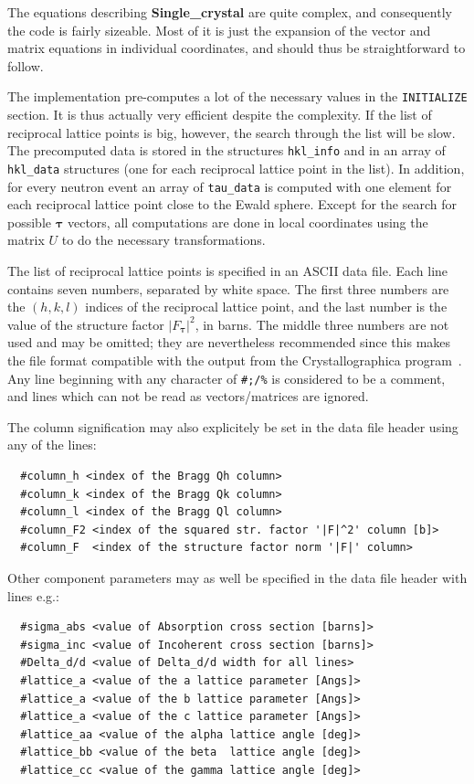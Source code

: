 The equations describing \textbf{Single\_crystal} are quite
complex, and consequently the code is fairly sizeable. Most of it is
just the expansion of the vector and matrix equations in individual
coordinates, and should thus be straightforward to follow.

The implementation pre-computes a lot of the necessary values in the
\texttt{INITIALIZE} section. It is thus actually very efficient despite
the complexity. If the list of reciprocal lattice points is big,
however, the search through the list will be slow. The precomputed data
is stored in the structures \texttt{hkl\_info} and in an array of
\texttt{hkl\_data} structures (one for each reciprocal lattice point in
the list). In addition, for every neutron event an array of
\texttt{tau\_data} is computed with one element for each reciprocal
lattice point close to the Ewald sphere. Except for the search for
possible $\boldsymbol{\tau}$ vectors, all computations are done in local
coordinates using the matrix $U$ to do the necessary transformations.

The list of reciprocal lattice points is specified in an ASCII data
file. Each line contains seven numbers, separated by white space. The
first three numbers are the $(h,k,l)$ indices of the reciprocal lattice
point, and the last number is the value of the structure factor
$|F_{\boldsymbol{\tau}}|^2$, in barns. The middle three numbers are not
used and may be omitted; they are nevertheless recommended since this makes
the file format compatible with the output from the Crystallographica
program~\cite{crystallographica}.
Any line beginning with any character of \verb+#;/%+ is considered to be a
comment, and lines which can not be read as vectors/matrices are ignored.

The column signification may also explicitely be set in the data file header using any of the lines:
\begin{lstlisting}
  #column_h <index of the Bragg Qh column>
  #column_k <index of the Bragg Qk column>
  #column_l <index of the Bragg Ql column>
  #column_F2 <index of the squared str. factor '|F|^2' column [b]>
  #column_F  <index of the structure factor norm '|F|' column>
\end{lstlisting}

Other component parameters may as well be specified in the data file
header with lines e.g.:
\begin{lstlisting}
  #sigma_abs <value of Absorption cross section [barns]>
  #sigma_inc <value of Incoherent cross section [barns]>
  #Delta_d/d <value of Delta_d/d width for all lines>
  #lattice_a <value of the a lattice parameter [Angs]>
  #lattice_a <value of the b lattice parameter [Angs]>
  #lattice_a <value of the c lattice parameter [Angs]>
  #lattice_aa <value of the alpha lattice angle [deg]>
  #lattice_bb <value of the beta  lattice angle [deg]>
  #lattice_cc <value of the gamma lattice angle [deg]>
\end{lstlisting}

